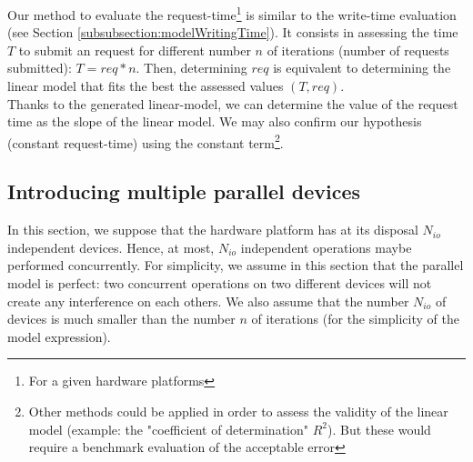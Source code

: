 			Our method to evaluate the \notationaio\space request-time\footnote{For a given hardware platforms} is similar to the \notationIO\space write-time evaluation (see Section \ref{subsubsection:modelWritingTime}).   It consists in assessing the time $T$ to submit an \notationaio\space request for different number $n$ of iterations (number of requests submitted): $T = req * n$.   Then, determining $req$ is equivalent to determining the linear model that fits the best the assessed values $(T, req)$.\\

			Thanks to the generated linear-model, we can determine the value of the request time as the slope of the linear model.   We may also confirm our hypothesis (constant \notationaio\space request-time) using the constant term\footnote{Other methods could be applied in order to assess the validity of the linear model (example: the "coefficient of determination" $R^{2}$).   But these would require a benchmark evaluation of the acceptable error}.\\


	\subsection{Introducing multiple parallel \notationIO\space devices} \label{subsection:multipleParallelIoDevice}
		In this section, we suppose that the hardware platform has at its disposal $N_{io}$ independent \notationIO\space devices.   Hence, at most, $N_{io}$ independent \notationIO\space operations maybe performed concurrently.   For simplicity, we assume in this section that the parallel \notationIO\space model is perfect: two concurrent \notationIO\space operations on two different \notationIO\space devices will not create any interference on each others.   We also assume that the number $N_{io}$ of \notationIO\space devices is much smaller than the number $n$ of iterations (for the simplicity of the model expression).\\

